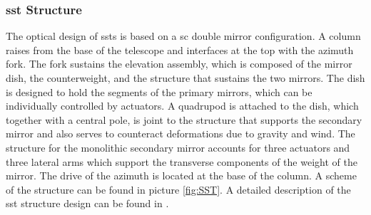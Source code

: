 \documentclass[main.tex]{subfiles}
\begin{document}
\subsubsection{\gls{sst} Structure}

The optical design of \glspl{sst} is based on a \gls{sc} double mirror configuration. A column raises from the base of the telescope and interfaces at the top with the azimuth fork. The fork sustains the elevation assembly, which is composed of the mirror dish, the counterweight, and the structure that sustains the two mirrors. The dish is designed to hold the segments of the primary mirrors, which can be individually controlled by actuators. A quadrupod is attached to the dish, which together with a central pole, is joint to the structure that supports the secondary mirror and also serves to counteract deformations due to gravity and wind. The structure for the monolithic secondary mirror accounts for three actuators and three lateral arms which support the transverse components of the weight of the mirror. The drive of the azimuth is located at the base of the column. A scheme of the structure can be found in picture \ref{fig:SST}. A detailed description of the \gls{sst} structure design can be found in \cite{2013SSTstruct}.
\end{document}
